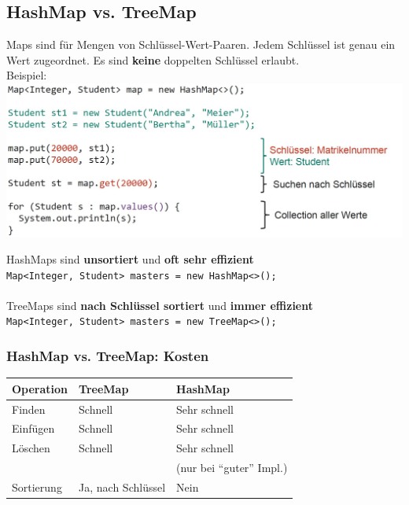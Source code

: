 \subsection{HashMap vs. TreeMap}
Maps sind für Mengen von Schlüssel-Wert-Paaren. Jedem Schlüssel ist genau ein Wert zugeordnet. Es sind \textbf{keine} doppelten Schlüssel erlaubt. \\
Beispiel:\\
\includegraphics[width=0.7\linewidth]{pictures/map-beispiel.jpg}

HashMaps sind \textbf{unsortiert} und \textbf{oft sehr effizient}\\
\verb|Map<Integer, Student> masters = new HashMap<>();|
\\
\\
TreeMaps sind \textbf{nach Schlüssel sortiert} und \textbf{immer effizient}\\
\verb|Map<Integer, Student> masters = new TreeMap<>();|

\subsubsection{HashMap vs. TreeMap: Kosten}
\begin{tabular}{l l l} \hline
    \textbf{Operation} & \textbf{TreeMap} & \textbf{HashMap }\\ \hline
    Finden      & \color{yellow!75!red} Schnell             & \color{green!80!black}Sehr schnell \\
    Einfügen    & \color{yellow!75!red} Schnell             & \color{green!80!black}Sehr schnell \\
    Löschen     & \color{yellow!75!red} Schnell             & \color{green!80!black}Sehr schnell \\
                &                                           & \color{green!80!black}(nur bei ``guter'' Impl.) \\
    Sortierung  & \color{green!80!black} Ja, nach Schlüssel & \color{red}Nein                    \\
\end{tabular}

